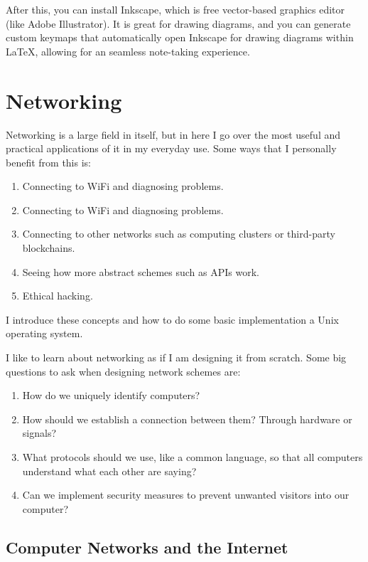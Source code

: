 \documentclass{article}
\begin{document}
  After this, you can install Inkscape, which is free vector-based graphics editor (like Adobe Illustrator). It is great for drawing diagrams, and you can generate custom keymaps that automatically open Inkscape for drawing diagrams within LaTeX, allowing for an seamless note-taking experience.  
    
\section{Networking}

  Networking is a large field in itself, but in here I go over the most useful and practical applications of it in my everyday use. Some ways that I personally benefit from this is:

  \begin{enumerate}
    \item Connecting to WiFi and diagnosing problems.  
    \item Connecting to WiFi and diagnosing problems. 
    \item Connecting to other networks such as computing clusters or third-party blockchains.  
    \item Seeing how more abstract schemes such as APIs work. 
    \item Ethical hacking. 
  \end{enumerate}
  I introduce these concepts and how to do some basic implementation a Unix operating system.

  I like to learn about networking as if I am designing it from scratch. Some big questions to ask when designing network schemes are:

  \begin{enumerate}
    \item How do we uniquely identify computers? 
    \item How should we establish a connection between them? Through hardware or signals? 
    \item What protocols should we use, like a common language, so that all computers understand what each other are saying? 
    \item Can we implement security measures to prevent unwanted visitors into our computer? 
  \end{enumerate} 

  \subsection{Computer Networks and the Internet}
\end{document}
